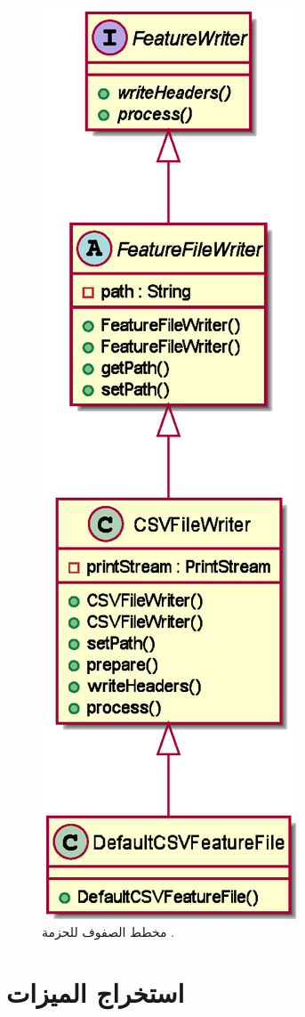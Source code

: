\begin{figure}[htb]
	\centering
	\includegraphics[width=0.25\linewidth]{images/cd-writers.eps}
	\caption{%
		مخطط الصفوف للحزمة .
	}
	\label{fig:cd:writers}
\end{figure}





\section{استخراج الميزات}









